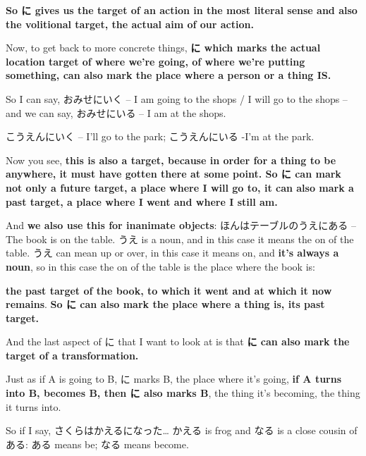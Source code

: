{\bf So に gives us the target of an action in the most literal sense and also the volitional target, the actual aim of our action.}

Now, to get back to more concrete things, {\bf に which marks the actual location target of where we're going, of where we're putting something, can also mark the place where a person or a thing IS.}

So I can say, おみせにいく -- I am going to the shops / I will go to the shops -- and we can say, おみせにいる -- I am at the shops.

{}

こうえんにいく -- I'll go to the park; こうえんにいる -I'm at the park.

{}

Now you see, {\bf this is also a target, because in order for a thing to be anywhere, it must have gotten there at some point. So に can mark not only a future target, a place where I will go to, it can also mark a past target, a place where I went and where I still am.}

\thinrule

And {\bf we also use this for inanimate objects}: ほんはテーブルのうえにある -- The book is on the table. うえ is a noun, and in this case it means the on of the table. うえ can mean up or over, in this case it means on, and {\bf it's always a noun}, so in this case the on of the table is the place where the book is:

{}

{\bf the past target of the book, to which it went and at which it now remains}. {\bf So に can also mark the place where a thing is, its past target.}

\startsectionlevel[title={に marking the target of a transformation},reference={に-marking-the-target-of-a-transformation}]

And the last aspect of に that I want to look at is that {\bf に can also mark the target of a transformation.}

{}

Just as if A is going to B, に marks B, the place where it's going, {\bf if A turns into B, becomes B, then に also marks B}, the thing it's becoming, the thing it turns into.

So if I say, さくらはかえるになった\ldots{} かえる is frog and なる is a close cousin of ある: ある means be; なる means become.

